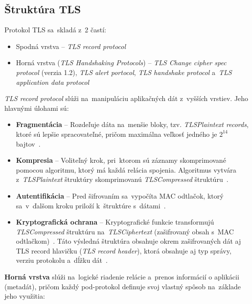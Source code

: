 \subsection{Štruktúra TLS}
Protokol TLS sa~skladá z~2 častí:~\cite{oppliger2023ssl}
\begin{itemize}
    \item Spodná vrstva -- \textit{TLS record protocol} 
    \item Horná vrstva (\textit{TLS Handshaking Protocols}) -- \textit{TLS Change cipher spec protocol} (verzia 1.2), \textit{TLS alert portocol}, \textit{TLS handshake protocol} a~\textit{TLS application data protocol}
\end{itemize}
\textit{TLS record protocol} slúži na~manipuláciu aplikačných dát z~vyšších vrstiev. Jeho hlavnými úlohami sú:
\begin{itemize}
    \item \textbf{Fragmentácia} -- Rozdeľuje dáta na~menšie bloky, tzv. \textit{TLSPlaintext records}, ktoré sú lepšie spracovateľné, pričom maximálna veľkosť jedného je $2^{14}$ bajtov~\cite{rfc5246}.

    \item \textbf{Kompresia} -- Voliteľný krok, pri~ktorom sú záznamy skomprimované pomocou algoritmu, ktorý má každá relácia spojenia. Algoritmus vytvára z~\textit{TLSPlaintext} štruktúry skomprimovanú \textit{TLSCompressed} štruktúru~\cite{rfc5246}.

    \item \textbf{Autentifikácia} -- Pred šifrovaním sa~vypočíta MAC odtlačok, ktorý sa~v~ďalšom kroku priloží k~štruktúre s~dátami~\cite{rfc5246}.

    \item \textbf{Kryptografická ochrana} -- Kryptografické funkcie transformujú \textit{TLSCompressed} štruktúru na~\textit{TLSCiphertext} (zašifrovaný obsah s~MAC odtlačkom)~\cite{rfc5246}. Táto výsledná štruktúra obsahuje okrem zašifrovaných dát aj TLS record hlavičku (\textit{TLS record header}), ktorá obsahuje aj typ správy, verziu protokolu a~dĺžku dát~\cite{oppliger2023ssl}.  
\end{itemize}
\textbf{Horná vrstva} slúži na~logické riadenie relácie a~prenos informácií o aplikácii (metadát), pričom každý pod-protokol definuje svoj vlastný spôsob na~základe jeho využitia:

